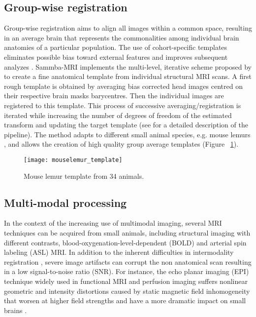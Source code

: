 \documentclass[utf8, a4paper, final, crop]{frontiersSCNS}
\begin{document}
\subsection{Group-wise registration}
Group-wise registration aims to align all images within a common
space, resulting in an average brain that represents the commonalities among
individual brain anatomies of a particular population.
The use of cohort-specific templates eliminates possible bias toward external
features and improves subsequent analyzes \citep{de2019towards}.
Sammba-MRI implements the multi-level, iterative scheme proposed by \citep{kovavcevic2005three}
to create a fine anatomical 
template from individual structural MRI scans. A first rough template is obtained
by averaging bias corrected head images centred on their respective brain masks barycentres. Then the individual images are registered to this template.
This process of successive averaging/registration is iterated while increasing the number of degrees of 
freedom of the estimated transform and updating the target template (see \citep{nadkarni20193d} for a detailed description of the pipeline).
The method adapts to different small animal species, e.g. mouse lemurs
\citep{nadkarni2018digital}, and allows the creation of high quality
group average templates (Figure ~\ref{fig:mouse_template}).
\begin{figure}[h!]
\begin{center}
\texttt{[image: mouselemur\_template]}
\end{center}
\caption{Mouse lemur template from 34 animals.}\label{fig:mouse_template}
\end{figure}

\subsection{Multi-modal processing}
In the context of the increasing use of multimodal imaging, several
MRI techniques can 
be acquired from small animals, including
structural imaging with different contrasts, 
blood-oxygenation-level-dependent (BOLD) and  arterial spin labeling (ASL) MRI.
In addition to the inherent difficulties in intermodality registration \citep{ashburner1997multimodal},
severe image artifacts can corrupt the non anatomical scan
resulting in a low signal-to-noise ratio (SNR).
For instance, the echo 
planar imaging (EPI) 
technique widely used in  
functional MRI and perfusion imaging
suffers nonlinear geometric and intensity distortions caused by static magnetic field 
inhomogeneity that 
worsen at higher field strengths and have a more dramatic impact on small brains
\citep{hong2015evaluation}. 
\end{document}
